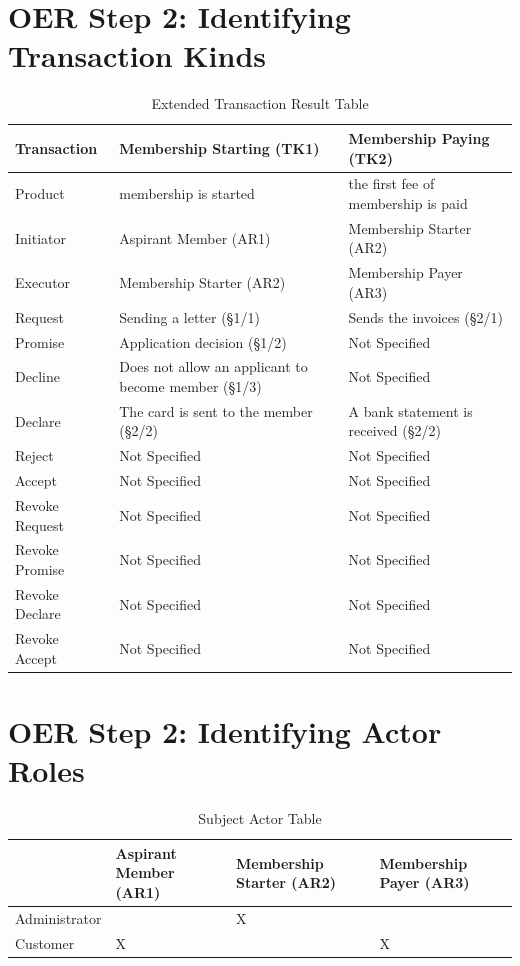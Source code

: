 \begin{landscape}
\section{OER Step 2: Identifying Transaction Kinds}

\begin{table}[h]
\caption{Extended Transaction Result Table}
\label{tab:etrt}
\begin{tabular}{|l||l|l|}
\hline
Transaction  & Membership Starting (TK1) & Membership Paying (TK2) \\ \hline
Product      & membership is started  & the first fee of membership is paid \\ \hline
Initiator      & Aspirant Member (AR1)   &  Membership Starter (AR2)\\ \hline
Executor       & Membership Starter (AR2) & Membership Payer (AR3)       \\ \hline
Request        & Sending a letter (\S1/1)  & Sends the invoices (\S2/1)   \\ \hline
Promise        &  Application decision  (\S1/2)  &  Not Specified    \\ \hline
Decline        &  Does not allow an applicant to become member (\S1/3)  & Not Specified  \\ \hline
Declare        & The card is sent to the member (\S2/2) & A bank statement is received  (\S2/2) \\ \hline
Reject         &  Not Specified             &  Not Specified   \\ \hline
Accept         & Not Specified  &  Not Specified  \\ \hline
Revoke Request & Not Specified                   & Not Specified        \\ \hline
Revoke Promise & Not Specified                   &  Not Specified       \\ \hline
Revoke Declare & Not Specified                    &  Not Specified      \\ \hline
Revoke Accept  &  Not Specified             &   Not Specified             \\ \hline
\end{tabular}
\end{table}

\section{OER Step 2: Identifying Actor Roles}

\begin{table}[h]
\caption{Subject Actor Table}
\label{tab:subjectactortable}
\begin{tabular}{|l|l|l|l|}
\hline
  & Aspirant Member (AR1)       & Membership Starter (AR2)  & Membership Payer (AR3)  \\ \hline
Administrator   &  & X  &   \\ \hline
Customer & X &  & X \\ \hline
\end{tabular}
\end{table}

\end{landscape}

